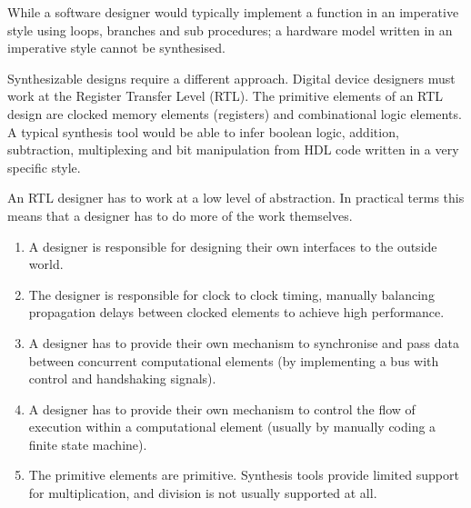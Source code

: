 \documentclass[letterpaper,10pt,english]{manual}
\begin{document}
While a software designer would typically implement a function in an
imperative style using loops, branches and sub procedures; a hardware model
written in an imperative style cannot be synthesised.

Synthesizable designs require a different approach. Digital device designers
must work at the Register Transfer Level (RTL). The primitive elements of an
RTL design are clocked memory elements (registers) and combinational logic
elements. A typical synthesis tool would be able to infer boolean logic,
addition, subtraction, multiplexing and bit manipulation from HDL code
written in a very specific style.

An RTL designer has to work at a low level of abstraction. In practical
terms this means that a designer has to do more of the work themselves.
\begin{enumerate}
\item {} 
A designer is responsible for designing their own interfaces to
the outside world.

\item {} 
The designer is responsible for clock to clock timing, manually
balancing propagation delays between clocked elements to achieve
high performance.

\item {} 
A designer has to provide their own mechanism to synchronise and
pass data between concurrent computational elements (by
implementing a bus with control and handshaking signals).

\item {} 
A designer has to provide their own mechanism to control the flow
of execution within a computational element (usually by manually
coding a finite state machine).

\item {} 
The primitive elements are primitive. Synthesis tools provide
limited support for multiplication, and division is not usually
supported at all.

\end{enumerate}
\end{document}
